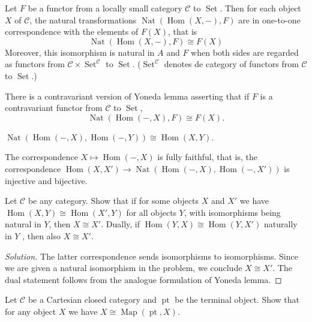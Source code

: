 \documentclass{article}
\numberwithin{equation}{section}
\newcommand{\Cc}{\mathcal{C}}
\DeclareMathOperator{\pt}{pt}
\DeclareMathOperator{\Set}{Set}
\DeclareMathOperator{\Hom}{Hom}
\DeclareMathOperator{\Map}{Map}
\DeclareMathOperator{\Nat}{Nat}
\begin{document}
\begin{lemma}
	Let $F$ be a functor from a locally small category $\Cc$ to $\Set$. Then for each object $X$ of $\Cc$, the natural transformations $\Nat(\Hom(X,-),F)$ are in one-to-one correspondence with the elements of $F(X)$, that is
	\[\Nat(\Hom(X,-), F)\cong F(X)\]
	Moreover, this isomorphism is natural in $A$ and $F$ when both sides are regarded as functors from $\Cc\times\Set^{\Cc}$ to $\Set$. ($\Set^{\Cc}$ denotes de category of functors from $\Cc$ to $\Set$.)
	
	There is a contravariant version of Yoneda lemma asserting that if $F$ is a contravariant functor from $\Cc$ to $\Set$,
	\[\Nat(\Hom(-,X), F)\cong F(X).\]
\end{lemma}
\begin{coro}
	$\Nat (\Hom(-,X),\Hom(-,Y))\cong\Hom(X,Y)$.
\end{coro}
\begin{remark}
	The correspondence $X\mapsto\Hom(-,X)$ is fully faithful, that is, the correspondence $\Hom(X,X')\to\Nat(\Hom(-,X),\Hom(-,X'))$ is injective and bijective.
\end{remark}
\begin{exercise}[a]
	Let $\Cc$ be any category. Show that if for some objects $X$ and $X'$ we have $\Hom(X, Y )\cong \Hom(X', Y )$ for all objects $Y$, with isomorphisms being natural in $Y$, then $X\cong X'$. Dually, if $\Hom(Y, X) \cong \Hom(Y, X')$ naturally in $Y$ , then also $X\cong X'$.
\end{exercise}
\begin{proof}[Solution]
	The latter correspondence sends isomorphisms to isomorphisms. Since we are given a natural isomorphism in the problem, we conclude $X\cong X'$. The dual statement follows from the analogue formulation of Yoneda lemma.
\end{proof}
\begin{exercise}[b]
	Let $\Cc$ be a Cartesian closed category and $\pt$ be the terminal object. Show that for any object $X$ we have $X\cong\Map(\pt,X)$.
\end{exercise}
\end{document}
